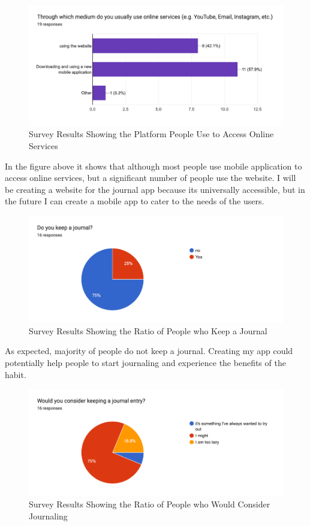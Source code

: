 \begin{figure}[H]
    \includegraphics[width=\textwidth]{Assets/survey_medium_of_service.png}
    \caption{Survey Results Showing the Platform People Use to Access Online Services}
    \label{fig:survey_medium_of_service}
\end{figure}

In the figure above it shows that although most people use mobile application to access online services, but a significant number of people use the website. I will be creating a website for the journal app because its universally accessible, but in the future I can create a mobile app to cater to the needs of the users.


\begin{figure}[H]
  \includegraphics[width=\textwidth]{Assets/survey_keep_journal_ratio.png}
  \caption{Survey Results Showing the Ratio of People who Keep a Journal}
  \label{fig:survey_keep_journal_ratio}
\end{figure}

As expected, majority of people do not keep a journal. Creating my app could potentially help people to start journaling and experience the benefits of the habit.


\begin{figure}[H]
    \includegraphics[width=\textwidth]{Assets/survey_consider_journal.png}
    \caption{Survey Results Showing the Ratio of People who Would Consider Journaling}
    \label{fig:survey_consider_journal}
\end{figure}

